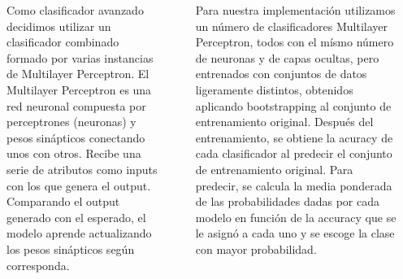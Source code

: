 \documentclass[25pt,landscape]{tikzposter}
\begin{document}
\begin{columns}
{		\paragraph{}Como clasificador avanzado decidimos utilizar un clasificador combinado formado por varias instancias de Multilayer Perceptron. El Multilayer Perceptron es una red neuronal compuesta por perceptrones (neuronas) y pesos sinápticos conectando unos con otros. Recibe una serie de atributos como inputs con los que genera el output. Comparando el output generado con el esperado, el modelo aprende actualizando los pesos sinápticos según corresponda.
		\paragraph{}Para nuestra implementación utilizamos un número de clasificadores Multilayer Perceptron, todos con el mísmo número de neuronas y de capas ocultas, pero entrenados con conjuntos de datos ligeramente distintos, obtenidos aplicando bootstrapping al conjunto de entrenamiento original. Después del entrenamiento, se obtiene la acuracy de cada clasificador al predecir el conjunto de entrenamiento original. Para predecir, se calcula la media ponderada de las probabilidades dadas por cada modelo en función de la accuracy que se le asignó a cada uno y se escoge la clase con mayor probabilidad.
    }

\end{columns}
\end{document}
